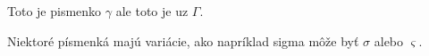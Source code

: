 \documentclass{book}
\begin{document}
Toto je pismenko $\gamma$ ale toto je uz $\Gamma$.

Niektoré písmenká majú variácie, ako napríklad sigma môže byť $\sigma$ alebo $\varsigma$.
\end{document}
